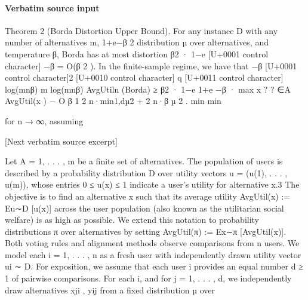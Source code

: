 \documentclass[10pt]{article}
\begin{document}
\paragraph{Verbatim source input}
\begin{ReviewVerbatim}
Theorem 2 (Borda Distortion Upper Bound). For any instance D with any number of alternatives m,
                                                                                       1+e−β 2
distribution µ over alternatives, and temperature β, Borda has at most distortion β2 · 1−e
                                                                                               [U+0001 control character]
                                                                                           −β     =
O(β 2 ). In the finite-sample regime, we have that
                                −β [U+0001 control character]2
                                                                   [U+0010 control character] q                              [U+0011 control character]
                                                                           log(mnβ)     m log(mnβ)
AvgUtiln (Borda) ≥ β2 · 1−e 1+e −β    · max x
                                                            ?
                                              ? ∈A AvgUtil(x ) − O
                                                                    β
                                                                     1
                                                                      2 n·min{1,dµ2 }
                                                                                      +      2
                                                                                         n·β µ  2     .
                                                                                   min             min


                                                                               for n → ∞, assuming

[Next verbatim source excerpt]

Let A = {1, . . . , m} be a finite set of alternatives. The population of users is described by a
probability distribution D over utility vectors u = (u(1), . . . , u(m)), whose entries 0 ≤ u(x) ≤ 1
indicate a user’s utility for alternative x.3 The objective is to find an alternative x such that its average
utility AvgUtil(x) := Eu∼D [u(x)] across the user population (also known as the utilitarian social
welfare) is as high as possible. We extend this notation to probability distributions π over alternatives
by setting AvgUtil(π) := Ex∼π [AvgUtil(x)].
Both voting rules and alignment methods observe comparisons from n users. We model each
i = 1, . . . , n as a fresh user with independently drawn utility vector ui ∼ D. For exposition, we
assume that each user i provides an equal number d ≥ 1 of pairwise comparisons. For each i,
and for j = 1, . . . , d, we independently draw alternatives xji , yij from a fixed distribution µ over


\end{ReviewVerbatim}
\end{document}
